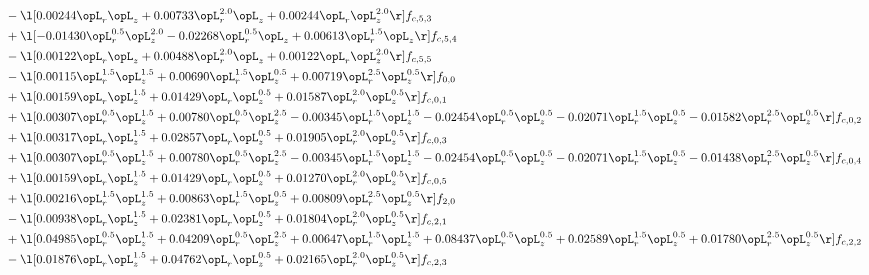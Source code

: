 \begin{alignat}{2}
& - \l[  0.00244 \opL_r \opL_z +  0.00733 \opL_r^{2.0} \opL_z +  0.00244 \opL_r \opL_z^{2.0}  \r] f_{c,5,3} \nonumber \\ 
& + \l[  -0.01430 \opL_r^{0.5} \opL_z^{2.0}   -0.02268 \opL_r^{0.5} \opL_z +  0.00613 \opL_r^{1.5} \opL_z  \r] f_{c,5,4} \nonumber \\ 
& - \l[  0.00122 \opL_r \opL_z +  0.00488 \opL_r^{2.0} \opL_z +  0.00122 \opL_r \opL_z^{2.0}  \r] f_{c,5,5} \nonumber \\ 
& - \l[  0.00115 \opL_r^{1.5} \opL_z^{1.5} +  0.00690 \opL_r^{1.5} \opL_z^{0.5} +  0.00719 \opL_r^{2.5} \opL_z^{0.5}  \r] f_{0,0} \nonumber \\ 
& + \l[  0.00159 \opL_r \opL_z^{1.5} +  0.01429 \opL_r \opL_z^{0.5} +  0.01587 \opL_r^{2.0} \opL_z^{0.5}  \r] f_{c,0,1} \nonumber \\ 
& + \l[  0.00307 \opL_r^{0.5} \opL_z^{1.5} +  0.00780 \opL_r^{0.5} \opL_z^{2.5}   -0.00345 \opL_r^{1.5} \opL_z^{1.5}   -0.02454 \opL_r^{0.5} \opL_z^{0.5}   -0.02071 \opL_r^{1.5} \opL_z^{0.5}   -0.01582 \opL_r^{2.5} \opL_z^{0.5}  \r] f_{c,0,2} \nonumber \\ 
& + \l[  0.00317 \opL_r \opL_z^{1.5} +  0.02857 \opL_r \opL_z^{0.5} +  0.01905 \opL_r^{2.0} \opL_z^{0.5}  \r] f_{c,0,3} \nonumber \\ 
& + \l[  0.00307 \opL_r^{0.5} \opL_z^{1.5} +  0.00780 \opL_r^{0.5} \opL_z^{2.5}   -0.00345 \opL_r^{1.5} \opL_z^{1.5}   -0.02454 \opL_r^{0.5} \opL_z^{0.5}   -0.02071 \opL_r^{1.5} \opL_z^{0.5}   -0.01438 \opL_r^{2.5} \opL_z^{0.5}  \r] f_{c,0,4} \nonumber \\ 
& + \l[  0.00159 \opL_r \opL_z^{1.5} +  0.01429 \opL_r \opL_z^{0.5} +  0.01270 \opL_r^{2.0} \opL_z^{0.5}  \r] f_{c,0,5} \nonumber \\ 
& + \l[  0.00216 \opL_r^{1.5} \opL_z^{1.5} +  0.00863 \opL_r^{1.5} \opL_z^{0.5} +  0.00809 \opL_r^{2.5} \opL_z^{0.5}  \r] f_{2,0} \nonumber \\ 
& - \l[  0.00938 \opL_r \opL_z^{1.5} +  0.02381 \opL_r \opL_z^{0.5} +  0.01804 \opL_r^{2.0} \opL_z^{0.5}  \r] f_{c,2,1} \nonumber \\ 
& + \l[  0.04985 \opL_r^{0.5} \opL_z^{1.5} +  0.04209 \opL_r^{0.5} \opL_z^{2.5} +  0.00647 \opL_r^{1.5} \opL_z^{1.5} +  0.08437 \opL_r^{0.5} \opL_z^{0.5} +  0.02589 \opL_r^{1.5} \opL_z^{0.5} +  0.01780 \opL_r^{2.5} \opL_z^{0.5}  \r] f_{c,2,2} \nonumber \\ 
& - \l[  0.01876 \opL_r \opL_z^{1.5} +  0.04762 \opL_r \opL_z^{0.5} +  0.02165 \opL_r^{2.0} \opL_z^{0.5}  \r] f_{c,2,3} \nonumber \\ 

\end{alignat}
